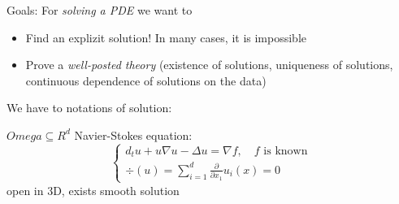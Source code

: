 \documentclass[ngerman, BCOR=5mm]{scrreprt}
\theoremstyle{tommy}
\begin{document}

Goals: For \emph{solving a PDE} we want to
\begin{itemize}
  \item Find an explizit solution! In many cases, it is impossible
  \item Prove a \emph{well-posted theory} (existence of solutions, uniqueness of solutions, continuous dependence of solutions on the data)
\end{itemize}

We have to notations of solution:

\(Omega \subseteq R^d\)
Navier-Stokes equation:
\[
  \begin{cases}
    d_t u + u \nabla u - \Delta u = \nabla f, \quad f \text{ is known} \\
    \div(u) = \sum_{i=1}^d \frac{\partial}{\partial x_1} u_i(x) = 0
  \end{cases}
\]
open in 3D, exists smooth solution
\end{document}
